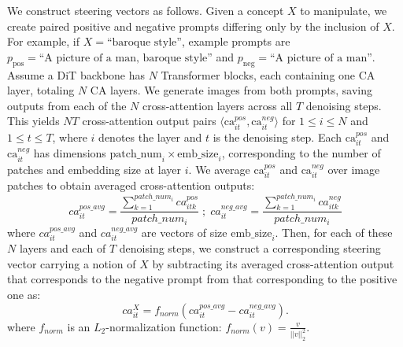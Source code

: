 We construct steering vectors as follows. 
%
Given a concept $X$ to manipulate, we create paired positive and negative prompts differing only by the inclusion of $X$.  
%
For example, if $X= \text{``baroque style''}$, example prompts are $p_{\text{pos}} = \text{``A picture of a man, baroque style''}$ and $p_{\text{neg}} = \text{``A picture of a man''}$.
%
Assume a DiT backbone has $N$ Transformer blocks, each containing one CA layer, totaling $N$ CA layers.
%
We generate images from both prompts, saving outputs from each of the $N$ cross-attention layers across all $T$ denoising steps.
%
This yields $NT$ cross-attention output pairs $\langle \text{ca}^{pos}_{it}, \text{ca}^{neg}_{it} \rangle$ for $ 1 \leqslant i \leqslant N$ and $1 \leqslant t \leqslant T$, where $i$ denotes the layer and $t$ is the denoising step.
%
Each $\text{ca}^{pos}_{it}$ and $\text{ca}^{neg}_{it}$ has dimensions $ \text{patch\_num}_i \times \text{emb\_size}_i $, corresponding to the number of patches and embedding size at layer $ i $. 
%
We average $ \text{ca}^{pos}_{it} $ and $ \text{ca}^{neg}_{it}$ over image patches to obtain averaged cross-attention outputs:
\begin{equation}
    ca^{pos\_avg}_{it} = \frac{\sum_{k=1}^{patch\_num_i} ca^{pos}_{itk}}{patch\_num_i} \;
    ; \;
    ca^{neg\_avg}_{it} = \frac{\sum_{k=1}^{patch\_num_i} ca^{neg}_{itk}}{patch\_num_i}
\end{equation}
\noindent where $ca^{pos\_avg}_{it}$ and $ca^{neg\_avg}_{it}$ are vectors of size $\text{emb\_size}_i$.
%
%
Then, for each of these $N$ layers and each of $T$ denoising steps, we construct a corresponding steering vector carrying a notion of $X$ by subtracting its averaged cross-attention output that corresponds to the negative prompt from that corresponding to the positive one as: 
\begin{equation}
ca^{X}_{it} = f_{norm}(ca^{pos\_avg}_{it} - ca^{neg\_avg}_{it}).
\end{equation} 
%
\noindent where $f_{norm}$ is an $L_2$-normalization function: $f_{norm}(v) = \frac{v}{||v||_2^2}$.
%
\vspace{-0.1cm}
